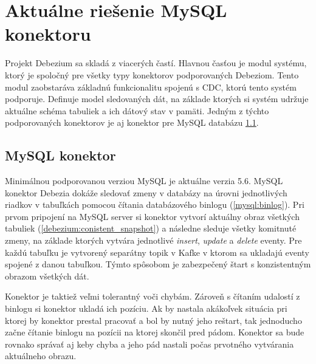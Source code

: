 \chapter{Aktuálne riešenie MySQL konektoru}
Projekt Debezium sa skladá z viacerých častí. Hlavnou časťou je modul systému, ktorý je spoločný pre všetky typy konektorov podporovaných Debeziom. Tento modul zaobstaráva základnú funkcionalitu spojenú s CDC, ktorú tento systém podporuje. Definuje model sledovaných dát, na základe ktorých si systém udržuje aktuálne schéma tabuliek a ich dátový stav v pamäti. Jedným z týchto podporovaných konektorov je aj konektor pre MySQL databázu \ref{debezium:mysql_connector}.

\section{MySQL konektor}\label{debezium:mysql_connector}
Minimálnou podporovanou verziou MySQL je aktuálne verzia 5.6. MySQL konektor Debezia dokáže sledovať zmeny v databázy na úrovni jednotlivých riadkov v tabuľkách pomocou čítania databázového binlogu (\ref{mysql:binlog}). Pri prvom pripojení na MySQL server si konektor vytvorí aktuálny obraz všetkých tabuliek (\ref{debezium:conistent_snapshot}) a následne sleduje všetky komitnuté zmeny, na základe ktorých vytvára jednotlivé \textit{insert}, \textit{update} a \textit{delete} eventy. Pre každú tabuľku je vytvorený separátny topik v Kafke v ktorom sa ukladajú eventy spojené z danou tabuľkou. Týmto spôsobom je zabezpečený štart s konzistentným obrazom všetkých dát.

Konektor je taktiež veľmi tolerantný voči chybám. Zároveň s čítaním udalostí z binlogu si konektor ukladá ich pozíciu. Ak by nastala akákoľvek situácia pri ktorej by konektor prestal pracovať a bol by nutný jeho reštart, tak jednoducho začne čítanie binlogu na pozícii na ktorej skončil pred pádom. Konektor sa bude rovnako správať aj keby chyba a jeho pád nastali počas prvotného vytvárania aktuálneho obrazu.

